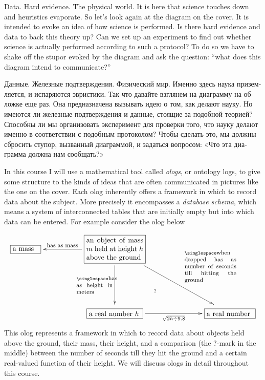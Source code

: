 \documentclass[a4paper]{book}
\def\tn{\textnormal}
\newcommand{\LA}[2]{\ar[#1]^-{\tn {#2}}}
\newcommand{\LAL}[2]{\ar[#1]_-{\tn {#2}}}
\newcommand{\obox}[3]{\stackrel{#1}{\fbox{\parbox{#2}{#3}}}}
\theoremstyle{myth}
\begin{document}
\begin{russian}
Data. Hard evidence. The physical world. It is here that science touches down and heuristics evaporate. So let's look again at the diagram on the cover. It is intended to evoke an idea of how science is performed. Is there hard evidence and data to back this theory up? Can we set up an experiment to find out whether science is actually performed according to such a protocol? To do so we have to shake off the stupor evoked by the diagram and ask the question: “what does this diagram intend to communicate?”

Данные. Железные подтверждения. Физический мир. Именно здесь наука приземляется, и испаряются эвристики. Так что давайте взглянем на диаграмму на обложке еще раз. Она предназначена вызывать идею о том, как делают науку. Но имеются ли железные подтверждения и данные, стоящие за подобной теорией? Способны ли мы организовать эксперимент для проверки того, что науку делают именно в соответствии с подобным протоколом? Чтобы сделать это, мы должны сбросить ступор, вызванный диаграммой, и задаться вопросом: «Что эта диаграмма должна нам сообщать?» 

In this course I will use a mathematical tool called {\em ologs}, or ontology logs, to give some structure to the kinds of ideas that are often communicated in pictures like the one on the cover. Each olog inherently offers a framework in which to record data about the subject. More precisely it encompasses a {\em database schema}, which means a system of interconnected tables that are initially empty but into which data can be entered. For example consider the olog below
$$\xymatrix{
\obox{}{.5in}{a mass}&&\obox{}{1.1in}{an object of mass $m$ held at height $h$ above the ground}\LAL{ll}{\footnotesize has as mass}\LA{rrdd}{\hspace{.4in}\parbox{1in}{\singlespace\footnotesize when dropped has as number of seconds till hitting the ground}}\LAL{dd}{\parbox{.7in}{\singlespace\footnotesize has as height in meters}}&&\\\\
&&\obox{}{1in}{a real number $h$}\ar@{}[uurr]|(.35){?}\ar[rr]_-{\sqrt{2h\div 9.8}}&\hspace{.3in}&\obox{}{.9in}{a real number}
}
$$
This olog represents a framework in which to record data about objects held above the ground, their mass, their height, and a comparison (the ?-mark in the middle) between the number of seconds till they hit the ground and a certain real-valued function of their height. We will discuss ologs in detail throughout this course.


\end{russian}
\end{document}
